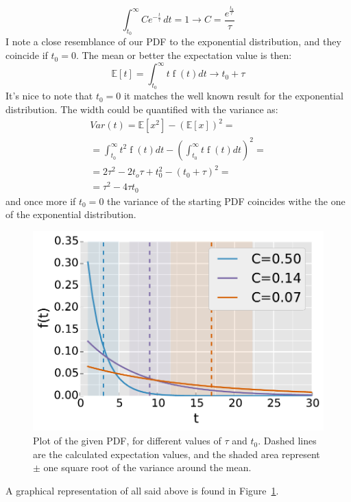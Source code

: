 \documentclass[twocolumn]{article}
\begin{document}
	\begin{equation}
		\int_{t_{{0}}}^{\infty} C e^{- \frac{t}{\tau}}\, dt = 1 \longrightarrow C =  \frac{
		e^{
		\frac{t_0}{\tau}
		}}
		{\tau}
	\end{equation}
	I note a close resemblance of our PDF to the exponential distribution, and they coincide if $t_0 = 0$. 
	The mean or better the expectation  value is then:
	\begin{equation}
	\mathbb{E} [t] = \int_{t_0}^{\infty} t \operatorname{f}{(t) d t } \longrightarrow  t_0 + \tau
	\end{equation}
	It's nice to note that $t_0 = 0$ it matches the well known result for the exponential distribution.
	The width could be quantified with the variance as:
	\begin{multline}
		Var(t) = \mathbb{E}[x^2] - (\mathbb{E}[x])^2 = \\
		= 
		\int_{t_0}^{\infty} t^2 \operatorname{f}{(t) d t } 
		-(\int_{t_0}^{\infty} t \operatorname{f}{(t) d t })^2 = \\
		= 2 \tau ^ 2 - 2 t_o \tau +t_0 ^2  - ( t_0 + \tau ) ^ 2 = \\
		= \tau ^ 2 - 4 \tau t_0 
	\end{multline}
	and once more if $t_0 = 0 $ the variance of the starting PDF coincides withe the one of the exponential distribution. 
	\begin{figure}[htb]
		\begin{center}
			\includegraphics[width= 0.4 \textwidth]{fig/graph.pdf}
		\end{center}
		\caption{Plot of the given PDF, for different values of $ \tau $ and $t_0 $. Dashed lines are the calculated expectation values, and the shaded area represent $\pm$ one square root of the variance around the mean.}
		\label{fig:pdf}
	\end{figure}
	A graphical representation of all said above is found in Figure~\ref{fig:pdf}.
\end{document}
